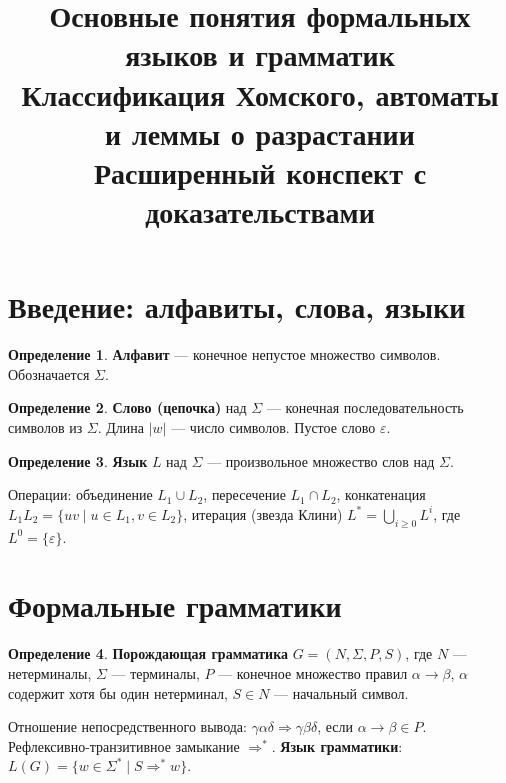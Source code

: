 \documentclass[12pt,a4paper]{article}
\title{Основные понятия формальных языков и грамматик\\
Классификация Хомского, автоматы и леммы о разрастании\\
\large{Расширенный конспект с доказательствами}}
\author{}
\date{}
\theoremstyle{definition}
\newtheorem{definition}{Определение}[section]
\newcommand{\emptystring}{\varepsilon}
\begin{document}
\maketitle

\section{Введение: алфавиты, слова, языки}

\begin{definition}
\textbf{Алфавит} --- конечное непустое множество символов. Обозначается $\Sigma$.
\end{definition}

\begin{definition}
\textbf{Слово (цепочка)} над $\Sigma$ --- конечная последовательность символов из $\Sigma$. Длина $|w|$ --- число символов. Пустое слово $\emptystring$.
\end{definition}

\begin{definition}
\textbf{Язык} $L$ над $\Sigma$ --- произвольное множество слов над $\Sigma$.
\end{definition}

Операции: объединение $L_1\cup L_2$, пересечение $L_1\cap L_2$, конкатенация $L_1L_2 = \{uv\mid u\in L_1, v\in L_2\}$, итерация (звезда Клини) $L^* = \bigcup_{i\ge 0} L^i$, где $L^0=\{\emptystring\}$.

\section{Формальные грамматики}

\begin{definition}
\textbf{Порождающая грамматика} $G = (N, \Sigma, P, S)$, где $N$ --- нетерминалы, $\Sigma$ --- терминалы, $P$ --- конечное множество правил $\alpha\to\beta$, $\alpha$ содержит хотя бы один нетерминал, $S\in N$ --- начальный символ.
\end{definition}

Отношение непосредственного вывода: $\gamma\alpha\delta \Rightarrow \gamma\beta\delta$, если $\alpha\to\beta\in P$. Рефлексивно-транзитивное замыкание $\Rightarrow^*$. \textbf{Язык грамматики}: $L(G) = \{w\in\Sigma^* \mid S\Rightarrow^* w\}$.
\end{document}
